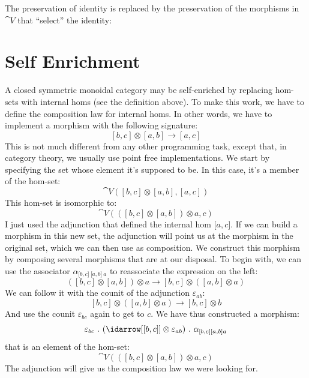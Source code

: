 \begin{figure}[H]
\centering
{}
\end{figure}

\noindent
The preservation of identity is replaced by the preservation of the
morphisms in $\cat{V}$ that ``select'' the identity:

\begin{figure}[H]
\centering
{}
\end{figure}

\section{Self Enrichment}

A closed symmetric monoidal category may be self-enriched by replacing
hom-sets with internal homs (see the definition above). To make this
work, we have to define the composition law for internal homs. In other
words, we have to implement a morphism with the following signature:
\[[b, c] \otimes [a, b] \to [a, c]\]
This is not much different from any other programming task, except that,
in category theory, we usually use point free implementations. We start
by specifying the set whose element it's supposed to be. In this case,
it's a member of the hom-set:
\[\cat{V}([b, c] \otimes [a, b], [a, c])\]
This hom-set is isomorphic to:
\[\cat{V}(([b, c] \otimes [a, b]) \otimes a, c)\]
I just used the adjunction that defined the internal hom
${[}a, c{]}$. If we can build a morphism in this new set, the
adjunction will point us at the morphism in the original set, which we
can then use as composition. We construct this morphism by composing
several morphisms that are at our disposal. To begin with, we can use
the associator $\alpha_{{[}b, c{]}\ {[}a, b{]}\ a}$ to reassociate the
expression on the left:
\[([b, c] \otimes [a, b]) \otimes a \to [b, c] \otimes ([a, b] \otimes a)\]
We can follow it with the counit of the adjunction $\varepsilon_{a b}$:
\[[b, c] \otimes ([a, b] \otimes a) \to [b, c] \otimes b\]
And use the counit $\varepsilon_{b c}$ again to get to $c$. We have
thus constructed a morphism:
\[\varepsilon_{b c}\ .\ (\idarrow[{[b, c]}] \otimes \varepsilon_{a b})\ .\ \alpha_{[b, c] [a, b] a}\]
that is an element of the hom-set:
\[\cat{V}(([b, c] \otimes [a, b]) \otimes a, c)\]
The adjunction will give us the composition law we were looking for.

